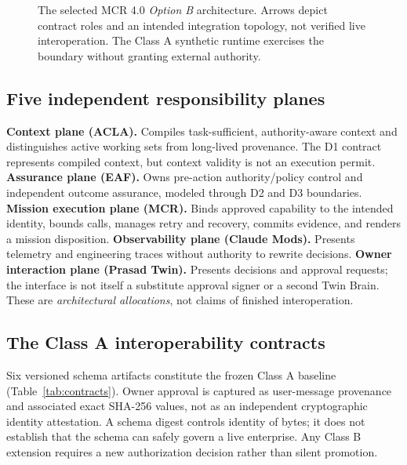 \documentclass[11pt,twocolumn]{article}
\begin{document}
\begin{figure}[t]
\caption{The selected MCR 4.0 \emph{Option B} architecture. Arrows depict contract roles and an intended integration topology, not verified live interoperation. The Class A synthetic runtime exercises the boundary without granting external authority.}
\label{fig:architecture}
\end{figure}

\subsection{Five independent responsibility planes}
\textbf{Context plane (ACLA).} Compiles task-sufficient, authority-aware context and distinguishes active working sets from long-lived provenance. The D1 contract represents compiled context, but context validity is not an execution permit. \textbf{Assurance plane (EAF).} Owns pre-action authority/policy control and independent outcome assurance, modeled through D2 and D3 boundaries. \textbf{Mission execution plane (MCR).} Binds approved capability to the intended identity, bounds calls, manages retry and recovery, commits evidence, and renders a mission disposition. \textbf{Observability plane (Claude Mods).} Presents telemetry and engineering traces without authority to rewrite decisions. \textbf{Owner interaction plane (Prasad Twin).} Presents decisions and approval requests; the interface is not itself a substitute approval signer or a second Twin Brain. These are \emph{architectural allocations}, not claims of finished interoperation.

\subsection{The Class A interoperability contracts}
Six versioned schema artifacts constitute the frozen Class A baseline (Table~\ref{tab:contracts}). Owner approval is captured as user-message provenance and associated exact SHA-256 values, not as an independent cryptographic identity attestation. A schema digest controls identity of bytes; it does not establish that the schema can safely govern a live enterprise. Any Class B extension requires a new authorization decision rather than silent promotion.
\end{document}
